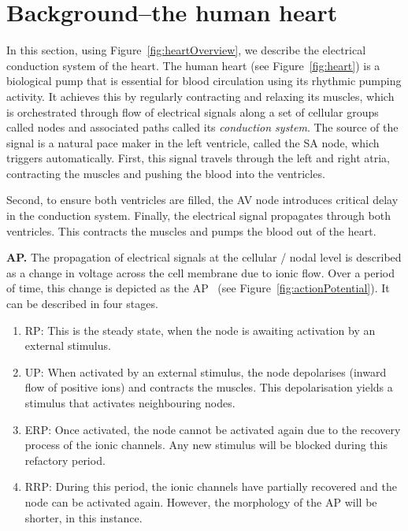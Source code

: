 \section{Background--the human heart }

In this section, using Figure~\ref{fig:heartOverview}, we describe the
electrical conduction system of the heart.
The human heart (see Figure~\ref{fig:heart}) is a biological pump that
is essential for blood circulation using its rhythmic pumping activity.
It achieves this by regularly contracting and relaxing its muscles,
which is orchestrated through flow of electrical signals along a set of
cellular groups called nodes and associated paths called its
\emph{conduction system}. The source of the signal is a natural pace
maker in the left ventricle, called the \ac{SA} node, which triggers
automatically. First, this signal travels through the left and right
atria, contracting the muscles and pushing the blood into the
ventricles.

Second, to ensure both ventricles are filled, the \ac{AV} node
introduces critical delay in the conduction system. Finally, the
electrical signal propagates through both ventricles. This contracts the
muscles and pumps the blood out of the heart.

\noindent \textbf{\acf{AP}.} The propagation of electrical signals at
the cellular / nodal level is described as a change in voltage across
the cell membrane due to ionic flow. Over a period of time, this change
is depicted as the \acf{AP}~\cite{chen14} (see 
Figure~\ref{fig:actionPotential}). It can be described in four
stages.
\begin{enumerate}
\item \acf{RP}: This is the steady state, when the node is awaiting
  activation by an external stimulus.
\item \acf{UP}: When activated by an external stimulus, the node
  depolarises (inward flow of positive ions) and contracts the
  muscles. This depolarisation yields a stimulus that activates
  neighbouring nodes.
\item \acf{ERP}: Once activated, the node cannot be activated again due
  to the recovery process of the ionic channels. Any new stimulus will
  be blocked during this refactory period.
\item \acf{RRP}: During this period, the ionic channels have partially
  recovered and the node can be activated again. However, the morphology
  of the \ac{AP} will be shorter, in this instance.

\end{enumerate}

